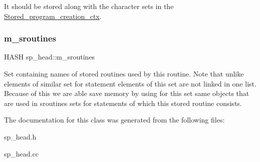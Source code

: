 It should be stored along with the character sets in the \mbox{\hyperlink{classStored__program__creation__ctx}{Stored\+\_\+program\+\_\+creation\+\_\+ctx}}. \mbox{\label{classsp__head_ab26a4954ad2a135c3876fa3e0f738ed9}} 
\subsubsection{\texorpdfstring{m\+\_\+sroutines}{m\_sroutines}}
{\footnotesize\ttfamily H\+A\+SH sp\+\_\+head\+::m\+\_\+sroutines}

Set containing names of stored routines used by this routine. Note that unlike elements of similar set for statement elements of this set are not linked in one list. Because of this we are able save memory by using for this set same objects that are used in \textquotesingle{}sroutines\textquotesingle{} sets for statements of which this stored routine consists. 

The documentation for this class was generated from the following files\+:\begin{DoxyCompactItemize}
\item 
sp\+\_\+head.\+h\item 
sp\+\_\+head.\+cc\end{DoxyCompactItemize}
